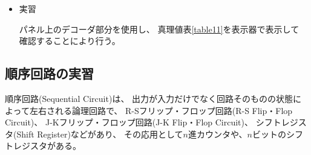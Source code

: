 \documentclass[12pt]{jarticle}
\begin{document}
\begin{itemize}
    \item 実習

          パネル上のデコーダ部分を使用し、
          真理値表\ref{table11}を表示器で表示して
          確認することにより行う。
\end{itemize}

\clearpage

\subsection{順序回路の実習}
順序回路(Sequential Circuit)は、
出力が入力だけでなく回路そのものの状態によって左右される論理回路で、
R-Sフリップ・フロップ回路(R-S Flip・Flop Circuit)、
J-Kフリップ・フロップ回路(J-K Flip・Flop Circuit)、
シフトレジスタ(Shift Register)などがあり、
その応用として$n$進カウンタや、$n$ビットのシフトレジスタがある。
\end{document}
